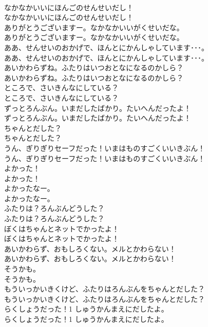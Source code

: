 \documentclass[8pt]{extreport}
\begin{document}
\begin{CJK}{UTF8}{min}
\\	なかなかいいにほんごのせんせいだし！	
\\	なかなかいいにほんごのせんせいだし！ 
\\	ありがとうございますー。なかなかいいがくせいだな。	
\\	ありがとうございますー。なかなかいいがくせいだな。 
\\	ああ、せんせいのおかげで、ほんとにかんしゃしています･･･。	
\\	ああ、せんせいのおかげで、ほんとにかんしゃしています･･･。 
\\	あいかわらずね。ふたりはいつおとなになるのかしら？	
\\	あいかわらずね。ふたりはいつおとなになるのかしら？ 
\\	ところで、さいきんなにしている？	
\\	ところで、さいきんなにしている？ 
\\	ずっとろんぶん。いまだしたばかり。たいへんだったよ！	
\\	ずっとろんぶん。いまだしたばかり。たいへんだったよ！ 
\\	ちゃんとだした？	
\\	ちゃんとだした？ 
\\	うん、ぎりぎりセーフだった！いまはものすごくいいきぶん！	
\\	うん、ぎりぎりセーフだった！いまはものすごくいいきぶん！ 
\\	よかった！	
\\	よかった！ 
\\	よかったなー。	
\\	よかったなー。 
\\	ふたりは？ろんぶんどうした？	
\\	ふたりは？ろんぶんどうした？ 
\\	ぼくはちゃんとネットでかったよ！	
\\	ぼくはちゃんとネットでかったよ！ 
\\	あいかわらず、おもしろくない。メルとかわらない！	
\\	あいかわらず、おもしろくない。メルとかわらない！ 
\\	そうかも。	
\\	そうかも。 
\\	もういっかいきくけど、ふたりはろんぶんをちゃんとだした？	
\\	もういっかいきくけど、ふたりはろんぶんをちゃんとだした？ 
\\	らくしょうだった！1 しゅうかんまえにだしたよ。	
\\	らくしょうだった！1 しゅうかんまえにだしたよ。 

\end{CJK}
\end{document}
